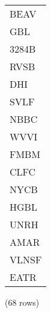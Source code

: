 \begin{tabular}{l}
BEAV \\
GBL \\
3284B \\
RVSB \\
DHI \\
SVLF \\
NBBC \\
WVVI \\
FMBM \\
CLFC \\
NYCB \\
HGBL \\
UNRH \\
AMAR \\
VLNSF \\
EATR \\
\end{tabular}

\noindent (68 rows) \\

